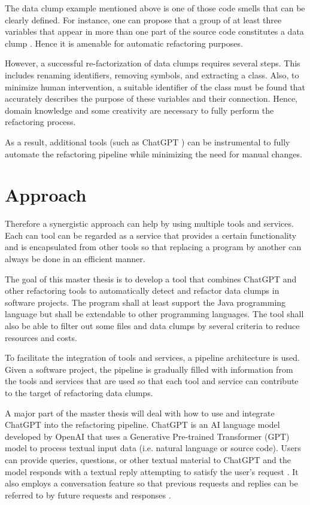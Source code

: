The data clump example mentioned above is one of those code smells that can be clearly defined. For instance, one can propose that a group of at least three variables that appear in more than one part of the source code constitutes a data clump \cite{zhangImprovingPrecisionFowler2008}. Hence it is amenable for automatic refactoring purposes. 


However, a successful re-factorization of data clumps requires several steps. This includes renaming identifiers, removing symbols, and extracting a class. Also, to minimize human intervention, a suitable identifier of the class must be found that accurately describes the purpose of these variables and their connection. Hence, domain knowledge and some creativity are necessary to fully perform the refactoring process.

As a result,  additional tools (such as ChatGPT \cite{ChatGPT_url})  can be instrumental to fully automate the refactoring pipeline while minimizing the need for manual changes. 




\section{Approach}

Therefore a synergistic approach can help by using multiple tools and services.  Each can tool can be regarded as  a service that provides a certain functionality and is encapsulated from other tools so that replacing a program by another can always be done in an efficient manner. 


The goal of this master thesis is to develop a tool that combines ChatGPT and other refactoring tools  to automatically detect and refactor data clumps in software projects. The program  shall at least support the Java programming language but shall be extendable to  other programming languages. The tool shall also  be able to filter out some files and data clumps by several criteria to reduce resources and costs. 




To facilitate the integration of tools and services, a pipeline architecture is used. Given a software project, the pipeline is gradually filled with information from the tools and services that are used so that each tool and service can contribute to the target of refactoring data clumps.

A major part of the master thesis will deal with how to use and integrate ChatGPT into the refactoring pipeline. 
ChatGPT is an AI language model developed by OpenAI that uses a Generative Pre-trained Transformer (GPT) model to process textual input data (i.e. natural language or source code). Users can provide queries, questions, or other textual material to ChatGPT and the model responds with a textual reply attempting to satisfy the user's request \cite{yetistirenEvaluatingCodeQuality2023}. It also employs a conversation feature so that previous requests and replies can be referred to by future requests and responses \cite{sobania2023analysis}.

